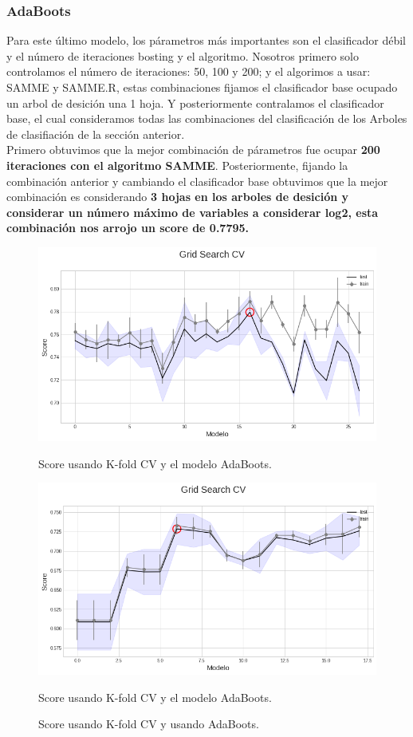 \documentclass[paper=letter, fontsize=11pt]{scrartcl}
\numberwithin{equation}{section} %
\numberwithin{figure}{section} %
\numberwithin{table}{section} %
\begin{document}
\subsubsection*{AdaBoots}
Para este último modelo, los párametros más importantes son el clasificador débil y el número de iteraciones bosting y el algoritmo. Nosotros primero solo controlamos el número de iteraciones: 50, 100 y 200; y el algorimos a usar: SAMME y SAMME.R, estas combinaciones fijamos el clasificador base ocupado un arbol de desición una 1 hoja. Y posteriormente contralamos el clasificador base, el cual consideramos todas las combinaciones del clasificación de los Arboles de clasifiación de la sección anterior.\\

Primero obtuvimos que la mejor combinación de párametros fue ocupar \textbf{200 iteraciones con el algoritmo SAMME}. Posteriormente, fijando la combinación anterior y cambiando el clasificador base obtuvimos que la mejor combinación es considerando\textbf{ 3 hojas en los arboles de desición y considerar un número máximo de variables a considerar log2, esta combinación nos arrojo un score de 0.7795.}
\begin{figure}[H]
 \includegraphics[scale=0.4]{figure/ada.png}\caption{Score usando K-fold CV y el modelo AdaBoots.}\label{ada}
\endminipage\hfill
{}
  \includegraphics[scale=0.4]{figure/ada_2.png}\caption{Score usando K-fold CV y el modelo AdaBoots.}\label{ada2}
\endminipage
\caption{Score usando K-fold CV y usando AdaBoots.}\label{adas}
\end{figure}
\end{document}

